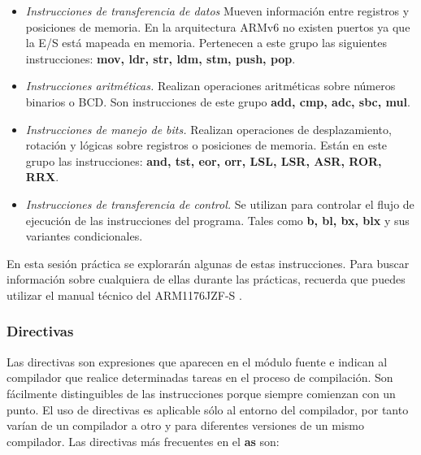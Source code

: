 \begin{itemize}

       \item \textit{Instrucciones de transferencia de datos}
Mueven información entre registros y posiciones de memoria. En la
arquitectura ARMv6 no existen puertos ya que la E/S está mapeada
en memoria. Pertenecen a este grupo las siguientes instrucciones:
\textbf{mov, ldr, str, ldm, stm, push, pop}.

       \item \textit{Instrucciones aritméticas.}  Realizan operaciones
aritméticas sobre números binarios o BCD.  Son instrucciones de este
grupo \textbf{add, cmp, adc, sbc, mul}.

     \item \textit{Instrucciones de manejo de bits.}  Realizan
operaciones de desplazamiento, rotación y lógicas sobre registros o
posiciones de memoria. Están en este grupo las instrucciones:\textbf{
and, tst, eor, orr, LSL, LSR, ASR, ROR, RRX}.

     \item \textit{Instrucciones de transferencia de control.}  Se
utilizan para controlar el flujo de ejecución de las instrucciones
del programa. Tales como \textbf{b, bl, bx, blx} y sus variantes
condicionales.

\end{itemize}

En esta sesión práctica se explorarán algunas de estas instrucciones.
Para buscar información sobre cualquiera de ellas durante las prácticas,
recuerda que puedes utilizar el manual técnico del ARM1176JZF-S \cite{ATRM}.

\subsubsection{Directivas}

Las directivas son expresiones que aparecen en el módulo fuente e
indican al compilador que realice determinadas tareas en el proceso
de compilación. Son fácilmente distinguibles de las instrucciones
porque siempre comienzan con un punto. El uso de directivas es
aplicable sólo al entorno del compilador, por tanto varían de un
compilador a otro y para diferentes versiones de un mismo compilador.
Las directivas más frecuentes en el {\bf as} son:

